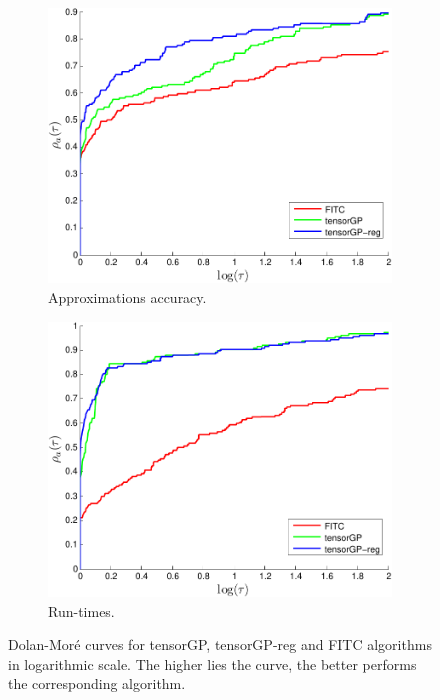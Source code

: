 \begin{figure}
  \centering
  \begin{subfigure}[b]{0.45\textwidth}
      \includegraphics[width=\textwidth]{figures/gp_on_grid/dolan_more.pdf}
      \caption{Approximations accuracy.}
      \label{fig:dolan_more}
  \end{subfigure}
  \begin{subfigure}[b]{0.45\textwidth}
      \includegraphics[width=\textwidth]{figures/gp_on_grid/dolan_more_time.pdf}
      \caption{Run-times.}
      \label{fig:dolan_more_time}
  \end{subfigure}
  \caption{Dolan-Mor\'e curves for tensorGP, tensorGP-reg and FITC algorithms
        in logarithmic scale.
        The higher lies the curve, the better performs the corresponding algorithm.}
\end{figure}

